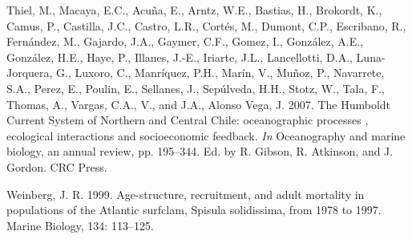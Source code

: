 \documentclass[12pt]{article}
\begin{document}
\leavevmode\hypertarget{ref-Thieletal2007}{}%
Thiel, M., Macaya, E.C., Acuña, E., Arntz, W.E., Bastias, H., Brokordt,
K., Camus, P., Castilla, J.C., Castro, L.R., Cortés, M., Dumont, C.P.,
Escribano, R., Fernández, M., Gajardo, J.A., Gaymer, C.F., Gomez, I.,
González, A.E., González, H.E., Haye, P., Illanes, J.-E., Iriarte, J.L.,
Lancellotti, D.A., Luna-Jorquera, G., Luxoro, C., Manríquez, P.H.,
Marín, V., Muñoz, P., Navarrete, S.A., Perez, E., Poulin, E., Sellanes,
J., Sepúlveda, H.H., Stotz, W., Tala, F., Thomas, A., Vargas, C.A., V.,
and J.A., Alonso Vega, J. 2007. The Humboldt Current System of Northern
and Central Chile: oceanographic processes , ecological interactions and
socioeconomic feedback. \emph{In} Oceanography and marine biology, an
annual review, pp. 195--344. Ed. by R. Gibson, R. Atkinson, and J.
Gordon. CRC Press.

\leavevmode\hypertarget{ref-Weinberg1999}{}%
Weinberg, J. R. 1999. Age-structure, recruitment, and adult mortality in
populations of the Atlantic surfclam, Spisula solidissima, from 1978 to
1997. Marine Biology, 134: 113--125.
\end{document}
